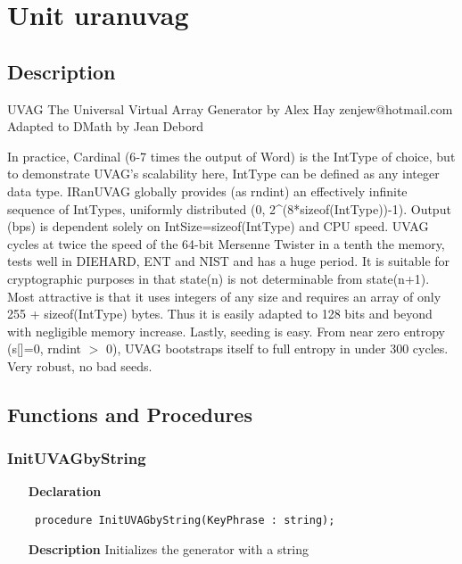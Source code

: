 \documentclass[12pt,a4paper,oneside]{report}
\newcommand{\declarationitem}[1]{\textbf{#1}}
\newcommand{\descriptiontitle}[1]{\textbf{#1}}
\newcommand{\code}[1]{\texttt{#1}}
\begin{document}
\section{Unit uranuvag}
\label{uranuvag}
\subsection{Description}
UVAG The Universal Virtual Array Generator by Alex Hay zenjew@hotmail.com Adapted to DMath by Jean Debord 

In practice, Cardinal (6{-}7 times the output of Word) is the IntType of choice, but to demonstrate UVAG's scalability here, IntType can be defined as any integer data type. IRanUVAG globally provides (as rndint) an effectively infinite sequence of IntTypes, uniformly distributed (0, 2{\^{}}(8*sizeof(IntType)){-}1). Output (bps) is dependent solely on IntSize=sizeof(IntType) and CPU speed. UVAG cycles at twice the speed of the 64{-}bit Mersenne Twister in a tenth the memory, tests well in DIEHARD, ENT and NIST and has a huge period. It is suitable for cryptographic purposes in that state(n) is not determinable from state(n+1). Most attractive is that it uses integers of any size and requires an array of only 255 + sizeof(IntType) bytes. Thus it is easily adapted to 128 bits and beyond with negligible memory increase. Lastly, seeding is easy. From near zero entropy (s[]=0, rndint {$>$} 0), UVAG bootstraps itself to full entropy in under 300 cycles. Very robust, no bad seeds.
\subsection{Functions and Procedures}
\subsubsection{InitUVAGbyString}
\label{uranuvag-InitUVAGbyString}
\begin{itemize}\item[\declarationitem{Declaration}\hfill]
	\begin{flushleft}
		\code{
			procedure InitUVAGbyString(KeyPhrase : string);}
		
	\end{flushleft}
	
	\par
	\item[\descriptiontitle{Description}]
	Initializes the generator with a string
	
\end{itemize}
\end{document}
